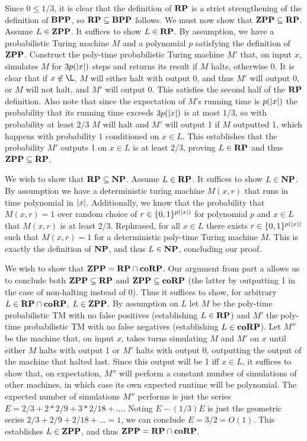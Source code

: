 \documentclass{article}
\begin{document}
\begin{alphalist}
\item Since $0 \le 1/3$, it is clear that the definition of $\mathbf{RP}$ is a strict strengthening of the definition of $\mathbf{BPP}$, so $\mathbf{RP} \subseteq \mathbf{BPP}$ follows. We must now show that $\mathbf{ZPP} \subseteq \mathbf{RP}$. Assume $L \in \mathbf{ZPP}$. It suffices to show $L \in \mathbf{RP}$. By assumption, we have a probabilistic Turing machine $M$ and a polynomial $p$ satisfying the definition of $\mathbf{ZPP}$. Construct the poly-time probabilistic Turing machine $M'$ that, on input $x$, simulates $M$ for $3p(\abs{x})$ steps and returns its result if $M$ halts, otherwise 0. It is clear that if $x \not \in \L$, $M$ will either halt with output 0, and thus $M'$ will output 0, or $M$ will not halt, and $M'$ will output 0. This satisfies the second half of the $\mathbf{RP}$ definition. Also note that since the expectation of $M$'s running time is $p(\abs{x})$ the probability that its running time exceeds $3p(\abs{x})$ is at most $1/3$, so with probability at least $2/3$ $M$ will halt and $M'$ will output 1 if $M$ outputted 1, which happens with probability $1$ conditioned on $x \in L$. This establishes that the probability $M'$ outputs 1 on $x \in L$ is at least 2/3, proving $L \in \mathbf{RP}$ and thus $\mathbf{ZPP} \subseteq \mathbf{RP}$.
\item We wish to show that $\mathbf{RP} \subseteq \mathbf{NP}$. Assume $L \in \mathbf{RP}$. It suffices to show $L \in \mathbf{NP}$. By assumption we have a deterministic turing machine $M(x, r)$ that runs in time polynomial in $\abs{x}$. Additionally, we know that the probability that $M(x, r) = 1$ over random choice of $r \in \{0, 1\}^{p(\abs{x})}$ for polynomial $p$ and $x \in L$ that $M(x, r)$ is at least 2/3. Rephrased, for all $x \in L$ there exists $r \in \{0, 1\}^{p(\abs{x})}$ such that $M(x, r) = 1$ for a deterministic poly-time Turing machine $M$. This is exactly the definition of $\mathbf{NP}$, and thus $L \in \mathbf{NP}$, concluding our proof.
\item We wish to show that $\mathbf{ZPP} = \mathbf{RP} \cap \mathbf{coRP}$. Our argument from part a allows us to conclude both $\mathbf{ZPP} \subseteq \mathbf{RP}$ and $\mathbf{ZPP} \subseteq \mathbf{coRP}$ (the latter by outputting 1 in the case of non-halting instead of 0). Thus it suffices to show, for arbitrary $L \in \mathbf{RP} \cap \mathbf{coRP}$, $L \in \mathbf{ZPP}$. By assumption on $L$ let $M$ be the poly-time probabilistic TM with no false positives (establishing $L \in \mathbf{RP}$) and $M'$ the poly-time probabilistic TM with no false negatives (establishing $L \in \mathbf{coRP}$). Let $M''$ be the machine that, on input $x$, takes turns simulating $M$ and $M'$ on $x$ until either $M$ halts with output 1 or $M'$ halts with output 0, outputting the output of the machine that halted last. Since this output will be 1 iff $x \in L$, it suffices to show that, on expectation, $M''$ will perform a constant number of simulations of other machines, in which case its own expected runtime will be polynomial. The expected number of simulations $M''$ performs is just the series $E = 2/3 + 2*2/9 + 3*2/18 + \ldots$. Noting $E - (1/3)E$ is just the geometric series $2/3 + 2/9 + 2/18 + \ldots = 1$, we can conclude $E = 3/2 = O(1)$. This establishes $L \in \mathbf{ZPP}$, and thus $\mathbf{ZPP} = \mathbf{RP} \cap \mathbf{coRP}$.
\end{alphalist}
\end{document}
